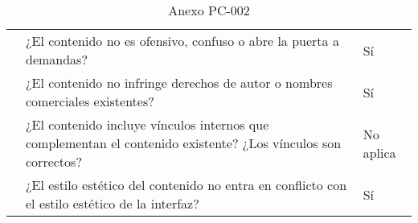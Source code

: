 \begin{table}[htpb]
\begin{tabularx}{\textwidth}{|l|X|l|}
                                     & ¿El contenido no es ofensivo, confuso o abre la puerta a demandas?                                            & Sí        \\ \cline{2-3} 
                                     & ¿El contenido no infringe derechos de autor o nombres comerciales existentes?                                 & Sí        \\ \cline{2-3} 
                                     & ¿El contenido incluye vínculos internos que complementan el contenido existente? ¿Los vínculos son correctos? & No aplica \\ \cline{2-3} 
                                     & ¿El estilo estético del contenido no entra en conflicto con el estilo estético de la interfaz?                & Sí        \\ \hline
\end{tabularx}
\caption{Anexo PC-002}
\end{table}


